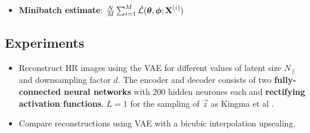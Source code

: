 

\begin{itemize}
	\item \textbf{Minibatch estimate}: $\frac{N}{M}\sum^{M}_{i=1}\tilde{\mathcal{L}}(\bm{\mathrm{\theta}},\bm{\mathrm{\phi}};\bm{\mathrm{X}}^{(i)})$
\end{itemize}




\subsection{Experiments}
\label{sub:experiments}


\begin{itemize}
	\item Reconstruct HR images using the VAE for different values of latent size $N_{\vec{z}}$ and downsampling factor $d$. The encoder and decoder consists of two \textbf{fully-connected neural networks} with $200$ hidden neurones each and \textbf{rectifying activation functions}. $L = 1$ for the sampling of $\vec{z}$ as Kingma et al \cite{Kingma2013}.
	\item Compare reconstructions using VAE with a bicubic interpolation upscaling.
\end{itemize}

